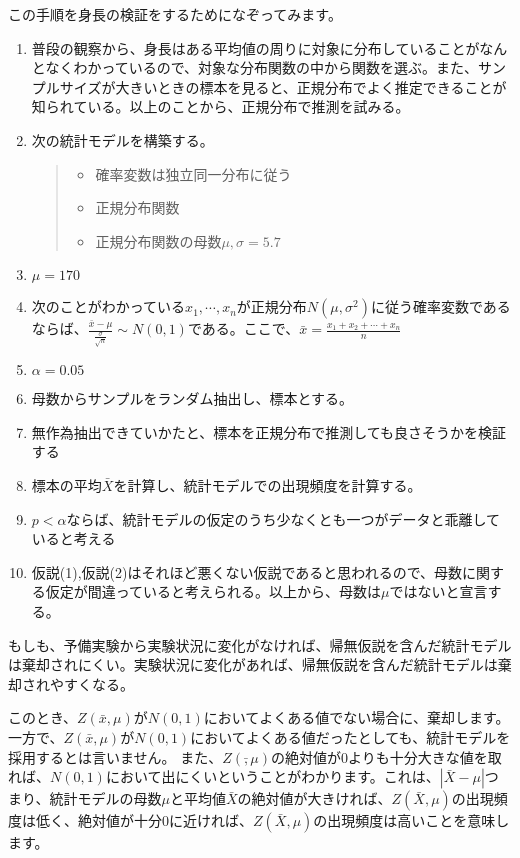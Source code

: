 

この手順を身長の検証をするためになぞってみます。
\begin{enumerate}
    \item 普段の観察から、身長はある平均値の周りに対象に分布していることがなんとなくわかっているので、対象な分布関数の中から関数を選ぶ。また、サンプルサイズが大きいときの標本を見ると、正規分布でよく推定できることが知られている。以上のことから、正規分布で推測を試みる。
    \item 次の統計モデルを構築する。
    \begin{quote}
        \begin{itemize}
            \item 確率変数は独立同一分布に従う
            \item 正規分布関数
            \item 正規分布関数の母数$\mu,\sigma=5.7$
        \end{itemize}
    \end{quote}
    \item $\mu=170$
    \item 次のことがわかっている$x_1,\cdots,x_n$が正規分布$N(\mu,\sigma^2)$に従う確率変数であるならば、$\frac{\bar{x}-\mu}{\frac{\sigma}{\sqrt{n}}}\sim N(0,1)$である。ここで、$\bar{x}=\frac{x_1+x_2+\cdots+x_n}{n}$
    \item $\alpha=0.05$
    \item 母数からサンプルをランダム抽出し、標本とする。
    \item 無作為抽出できていかたと、標本を正規分布で推測しても良さそうかを検証する
    \item 標本の平均$\bar{X}$を計算し、統計モデルでの出現頻度を計算する。
    \item $p<\alpha$ならば、統計モデルの仮定のうち少なくとも一つがデータと乖離していると考える
    \item 仮説(1),仮説(2)はそれほど悪くない仮説であると思われるので、母数に関する仮定が間違っていると考えられる。以上から、母数は$\mu$ではないと宣言する。
\end{enumerate}

もしも、予備実験から実験状況に変化がなければ、帰無仮説を含んだ統計モデルは棄却されにくい。実験状況に変化があれば、帰無仮説を含んだ統計モデルは棄却されやすくなる。


\fi







このとき、$Z(\bar{x},\mu)$が$N(0,1)$においてよくある値でない場合に、棄却します。
一方で、$Z(\bar{x},\mu)$が$N(0,1)$においてよくある値だったとしても、統計モデルを採用するとは言いません。
また、$Z(\bar,\mu)$の絶対値が$0$よりも十分大きな値を取れば、$N(0,1)$において出にくいということがわかります。これは、$|\bar{X}-\mu|$つまり、統計モデルの母数$\mu$と平均値$\bar{X}$の絶対値が大きければ、$Z(\bar{X},\mu)$の出現頻度は低く、絶対値が十分$0$に近ければ、$Z(\bar{X},\mu)$の出現頻度は高いことを意味します。

